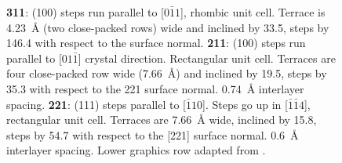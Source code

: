 \begin{figure}
{		\textbf{311}: (100) steps run parallel to [$0 \bar 1 1$], rhombic unit cell. Terrace is \SI{4,23}{\angstrom} (two close-packed rows) wide and inclined by \SI{33,5}{\deg}, steps by \SI{146,4}{\deg} with respect to the surface normal.
		\textbf{211}: (100) steps run parallel to [$0 1 \bar 1$] crystal direction. Rectangular unit cell. Terraces are four close-packed row wide (\SI{7,66}{\angstrom}) and inclined by \SI{19,5}{\deg}, steps by \SI{35,3}{\deg} with respect to the 221 surface normal. \SI{0,74}{\angstrom} interlayer spacing.
		\textbf{221}: (111) steps parallel to [$\bar 1 1 0$]. Steps go up in [$\bar 1 \bar 1 4$], rectangular unit cell. Terraces are \SI{7,66}{\angstrom} wide, inclined by \SI{15,8}{\deg}, steps by \SI{54,7}{\deg} with respect to the [221] surface normal. \SI{0,6}{\angstrom} interlayer spacing. Lower graphics row adapted from \cite{riemann_ionic_2002}.
	}
	\label{tab:step-heights}
\end{figure}

